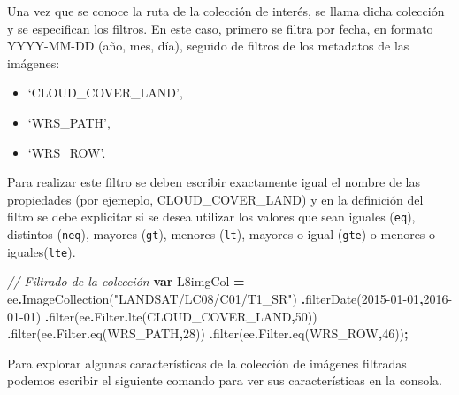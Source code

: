 \documentclass[
  12pt,
  letterpaper,
  twoside]{book}
\newenvironment{Shaded}{\begin{snugshade}}{\end{snugshade}}
\newcommand{\AttributeTok}[1]{\textcolor[rgb]{0.77,0.63,0.00}{#1}}
\newcommand{\CommentTok}[1]{\textcolor[rgb]{0.56,0.35,0.01}{\textit{#1}}}
\newcommand{\DecValTok}[1]{\textcolor[rgb]{0.00,0.00,0.81}{#1}}
\newcommand{\FunctionTok}[1]{\textcolor[rgb]{0.00,0.00,0.00}{#1}}
\newcommand{\KeywordTok}[1]{\textcolor[rgb]{0.13,0.29,0.53}{\textbf{#1}}}
\newcommand{\NormalTok}[1]{#1}
\newcommand{\OperatorTok}[1]{\textcolor[rgb]{0.81,0.36,0.00}{\textbf{#1}}}
\newcommand{\StringTok}[1]{\textcolor[rgb]{0.31,0.60,0.02}{#1}}
\providecommand{\tightlist}{%
  \setlength{\itemsep}{0pt}\setlength{\parskip}{0pt}}
\begin{document}
Una vez que se conoce la ruta de la colección de interés, se llama dicha colección y se especifican los filtros. En este caso, primero se filtra por fecha, en formato YYYY-MM-DD (año, mes, día), seguido de filtros de los metadatos de las imágenes:

\begin{itemize}
\tightlist
\item
  `CLOUD\_COVER\_LAND',
\item
  `WRS\_PATH',
\item
  `WRS\_ROW'.
\end{itemize}

Para realizar este filtro se deben escribir exactamente igual el nombre de las propiedades (por ejemeplo, CLOUD\_COVER\_LAND) y en la definición del filtro se debe explicitar si se desea utilizar los valores que sean iguales (\texttt{eq}), distintos (\texttt{neq}), mayores (\texttt{gt}), menores (\texttt{lt}), mayores o igual (\texttt{gte}) o menores o iguales(\texttt{lte}).

\begin{Shaded}
\begin{Highlighting}[]
\CommentTok{// Filtrado de la colección}
\KeywordTok{var}\NormalTok{ L8imgCol }\OperatorTok{=}\NormalTok{ ee}\OperatorTok{.}\FunctionTok{ImageCollection}\NormalTok{(}\StringTok{"LANDSAT/LC08/C01/T1\_SR"}\NormalTok{)}
  \OperatorTok{.}\FunctionTok{filterDate}\NormalTok{(}\StringTok{\textquotesingle{}2015{-}01{-}01\textquotesingle{}}\OperatorTok{,}\StringTok{\textquotesingle{}2016{-}01{-}01\textquotesingle{}}\NormalTok{)}
  \OperatorTok{.}\FunctionTok{filter}\NormalTok{(ee}\OperatorTok{.}\AttributeTok{Filter}\OperatorTok{.}\FunctionTok{lte}\NormalTok{(}\StringTok{\textquotesingle{}CLOUD\_COVER\_LAND\textquotesingle{}}\OperatorTok{,}\DecValTok{50}\NormalTok{))}
  \OperatorTok{.}\FunctionTok{filter}\NormalTok{(ee}\OperatorTok{.}\AttributeTok{Filter}\OperatorTok{.}\FunctionTok{eq}\NormalTok{(}\StringTok{\textquotesingle{}WRS\_PATH\textquotesingle{}}\OperatorTok{,}\DecValTok{28}\NormalTok{))}
  \OperatorTok{.}\FunctionTok{filter}\NormalTok{(ee}\OperatorTok{.}\AttributeTok{Filter}\OperatorTok{.}\FunctionTok{eq}\NormalTok{(}\StringTok{\textquotesingle{}WRS\_ROW\textquotesingle{}}\OperatorTok{,}\DecValTok{46}\NormalTok{))}\OperatorTok{;}
\end{Highlighting}
\end{Shaded}

Para explorar algunas características de la colección de imágenes filtradas podemos escribir el siguiente comando para ver sus características en la consola.
\end{document}
